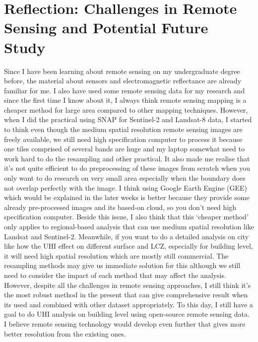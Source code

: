 \documentclass[
  letterpaper,
  DIV=11,
  numbers=noendperiod]{scrreprt}
\begin{document}
\section{Reflection: Challenges in Remote Sensing and Potential Future
Study}\label{reflection-challenges-in-remote-sensing-and-potential-future-study}

Since I have been learning about remote sensing on my undergraduate
degree before, the material about sensors and electromagnetic
reflectance are already familiar for me. I also have used some remote
sensing data for my research and since the first time I know about it, I
always think remote sensing mapping is a cheaper method for large area
compared to other mapping techniques. However, when I did the practical
using SNAP for Sentinel-2 and Landsat-8 data, I started to think even
though the medium spatial resolution remote sensing images are freely
available, we still need high specification computer to process it
because one tiles comprised of several bands are huge and my laptop
somewhat need to work hard to do the resampling and other practical. It
also made me realise that it's not quite efficient to do preprocessing
of these images from scratch when you only want to do research on very
small area especially when the boundary does not overlap perfectly with
the image. I think using Google Earth Engine (GEE) which would be
explained in the later weeks is better because they provide some already
pre-processed images and its based-on cloud, so you don't need high
specification computer. Beside this issue, I also think that this
`cheaper method' only applies to regional-based analysis that can use
medium spatial resolution like Landsat and Sentinel-2. Meanwhile, if you
want to do a detailed analysis on city like how the UHI effect on
different surface and LCZ, especially for building level, it will need
high spatial resolution which are mostly still commercial. The
resampling methods may give us immediate solution for this although we
still need to consider the impact of each method that may affect the
analysis. However, despite all the challenges in remote sensing
approaches, I still think it's the most robust method in the present
that can give comprehensive result when its used and combined with other
dataset appropriately. To this day, I still have a goal to do UHI
analysis on building level using open-source remote sensing data. I
believe remote sensing technology would develop even further that gives
more better resolution from the existing ones.

\end{document}
